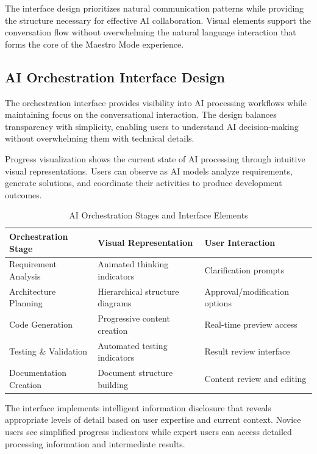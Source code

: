 The interface design prioritizes natural communication patterns while providing the structure necessary for effective AI collaboration. Visual elements support the conversation flow without overwhelming the natural language interaction that forms the core of the Maestro Mode experience.

\subsection*{AI Orchestration Interface Design}

The orchestration interface provides visibility into AI processing workflows while maintaining focus on the conversational interaction. The design balances transparency with simplicity, enabling users to understand AI decision-making without overwhelming them with technical details.

Progress visualization shows the current state of AI processing through intuitive visual representations. Users can observe as AI models analyze requirements, generate solutions, and coordinate their activities to produce development outcomes.

\begin{table}[ht]
\centering
\begin{tabular}{@{}lll@{}}
\toprule
\textbf{Orchestration Stage} & \textbf{Visual Representation} & \textbf{User Interaction} \\
\midrule
Requirement Analysis & Animated thinking indicators & Clarification prompts \\
Architecture Planning & Hierarchical structure diagrams & Approval/modification options \\
Code Generation & Progressive content creation & Real-time preview access \\
Testing \& Validation & Automated testing indicators & Result review interface \\
Documentation Creation & Document structure building & Content review and editing \\
\bottomrule
\end{tabular}
\caption{AI Orchestration Stages and Interface Elements}
\end{table}

The interface implements intelligent information disclosure that reveals appropriate levels of detail based on user expertise and current context. Novice users see simplified progress indicators while expert users can access detailed processing information and intermediate results.

